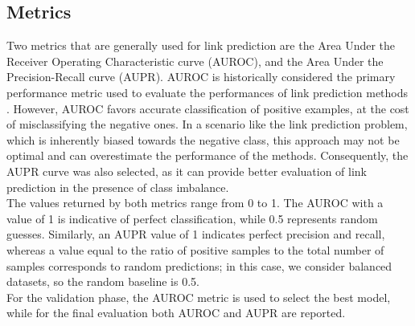 \subsection{Metrics}
Two metrics that are generally used for link prediction are the Area Under the Receiver Operating Characteristic curve (AUROC), and the Area Under the Precision-Recall curve (AUPR). 
AUROC is historically considered the primary performance metric used to evaluate the performances of link prediction methods \cite{Kalyani2025}. 
However, AUROC favors accurate classification of positive examples, at the cost of misclassifying the negative ones. 
In a scenario like the link prediction problem, which is inherently biased towards the negative class, this approach may not be optimal and can overestimate the performance of the methods. 
Consequently, the AUPR curve was also selected, as it can provide better evaluation of link prediction in the presence of class imbalance. 
\\\newline
The values returned by both metrics range from 0 to 1. 
The AUROC with a value of 1 is indicative of perfect classification, while 0.5 represents random guesses.
Similarly, an AUPR value of 1 indicates perfect precision and recall, whereas a value equal to the ratio of positive samples to the total number of samples corresponds to random predictions; in this case, we consider balanced datasets, so the random baseline is 0.5.
\\\newline
For the validation phase, the AUROC metric is used to select the best model, while for the final evaluation both AUROC and AUPR are reported.

